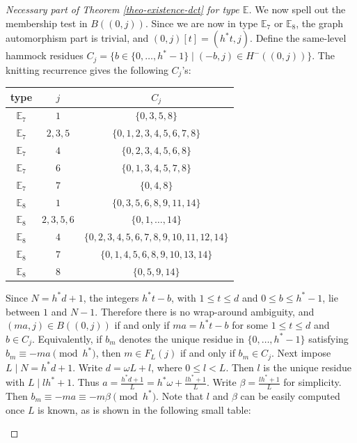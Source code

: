 \documentclass[12pt]{article}
\theoremstyle{plain}
\theoremstyle{definition}
\renewcommand{\leq}{\leqslant}
\begin{document}
\begin{proof}[Necessary part of Theorem \ref{theo-existence-dct} for type $\mathbb{E}$]
		We now spell out the membership test in \(B((0,j))\). Since we are now in
		type \(\mathbb E_7\) or \(\mathbb E_8\), the graph automorphism part is
		trivial, and
		\((0,j)[t]=(h^*t,j)\).  Define the same-level hammock residues
		\(C_j=\{b\in\{0,\ldots,h^*-1\}\mid (-b,j)\in H^-((0,j))\}.\)
The knitting recurrence gives the following \(C_j\)'s:
		\begin{center}
	\small
	\begin{tabular}{c|c|c}
	\toprule
	type&\(j\)&\(C_j\)\\
	\midrule
		\(\mathbb E_7\)&\(1\)&\(\{0,3,5,8\}\)\\
		\(\mathbb E_7\)&\(2,3,5\)&\(\{0,1,2,3,4,5,6,7,8\}\)\\
		\(\mathbb E_7\)&\(4\)&\(\{0,2,3,4,5,6,8\}\)\\
		\(\mathbb E_7\)&\(6\)&\(\{0,1,3,4,5,7,8\}\)\\
		\(\mathbb E_7\)&\(7\)&\(\{0,4,8\}\)\\
		\midrule
		\(\mathbb E_8\)&\(1\)&\(\{0,3,5,6,8,9,11,14\}\)\\
		\(\mathbb E_8\)&\(2,3,5,6\)&\(\{0,1,\ldots,14\}\)\\
		\(\mathbb E_8\)&\(4\)&\(\{0,2,3,4,5,6,7,8,9,10,11,12,14\}\)\\
		\(\mathbb E_8\)&\(7\)&\(\{0,1,4,5,6,8,9,10,13,14\}\)\\
		\(\mathbb E_8\)&\(8\)&\(\{0,5,9,14\}\)\\
		\bottomrule
		\end{tabular}
\vspace{0.5em}
\label{tab:exceptional-Cj}
		\end{center}
Since \(N=h^*d+1\), the integers \(h^*t-b\), with \(1\leq t\leq d\) and
		\(0\leq b\leq h^*-1\), lie between \(1\) and \(N-1\).  Therefore there is no
		wrap-around ambiguity, and
		\(
		(ma,j)\in B((0,j))\) if and only if \(ma=h^*t-b\) for some $1\leq t\leq d$ and $b\in C_j$.  
		Equivalently, if \(b_m\) denotes the unique residue in
		\(\{0,\ldots,h^*-1\}\) satisfying
		\(b_m\equiv -ma\pmod {h^*}\), 
		then $m\in F_L(j)$ if and only if \(b_m\in C_j\). Next impose \(L\mid N=h^*d+1\).  Write \(d=\omega L+l\), where
		\(0\leq l<L\).  Then \(l\) is the unique residue with
		\(L\mid lh^*+1\).  Thus 
			\(a=\frac{h^*d+1}{L} =h^*\omega+\frac{lh^*+1}{L}.\)
Write $\beta=\frac{lh^*+1}{L}$ for simplicity.  Then $b_m\equiv -ma\equiv -m\beta \pmod{h^*}$. Note that $l$ and $\beta$ can be easily computed once $L$ is known, as is shown in the following small table:
\begin{center}

\end{center}
\end{proof}
\end{document}
